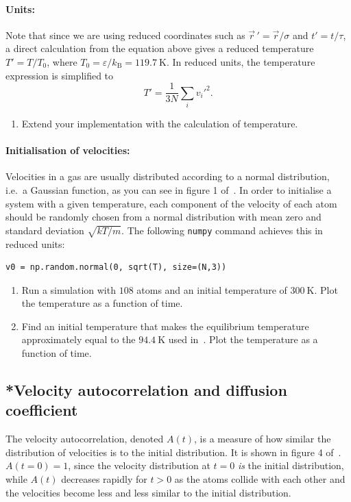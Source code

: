 \documentclass[11pt,british,a4paper]{report}
\begin{document}
\paragraph{Units:} Note that since we are using reduced coordinates such as \(\vec{r}\,'=\vec{r}/\sigma\) and \(t'=t/\tau\), a direct calculation from the equation above gives a reduced temperature \(T'=T/T_0\), where \(T_0 = \varepsilon/k_\mathrm{B}=\SI{119.7}{\kelvin}\). In reduced units, the temperature expression is simplified to
\[
    T' = \frac{1}{3N}\sum_i v_i'^2.
\]
\begin{enumerate}[label=\roman*.]
    \item Extend your implementation with the calculation of temperature.
\end{enumerate}

\paragraph{Initialisation of velocities:} Velocities in a gas are usually distributed according to a normal distribution, i.e.~a Gaussian function, as you can see in figure 1 of~\cite{Rahman_1964}. In order to initialise a system with a given temperature, each component of the velocity of each atom should be randomly chosen from a normal distribution with mean zero and standard deviation \(\sqrt{kT/m}\). The following \texttt{numpy} command achieves this in reduced units:
\begin{lstlisting}
v0 = np.random.normal(0, sqrt(T), size=(N,3))
\end{lstlisting}

\begin{enumerate}[label=\roman*.,resume]
    \item Run a simulation with \(108\) atoms and an initial temperature of \(\SI{300}{\kelvin}\). Plot the temperature as a function of time.
    \item Find an initial temperature that makes the equilibrium temperature approximately equal to the \(\SI{94.4}{\kelvin}\) used in~\cite{Rahman_1964}. Plot the temperature as a function of time.
\end{enumerate}

\subsection{*Velocity autocorrelation and diffusion coefficient}
The velocity autocorrelation, denoted \(A(t)\), is a measure of how similar the distribution of velocities is to the initial distribution. It is shown in figure 4 of~\cite{Rahman_1964}. \(A(t=0)=1\), since the velocity distribution at \(t=0\) \emph{is} the initial distribution, while \(A(t)\) decreases rapidly for \(t>0\) as the atoms collide with each other and the velocities become less and less similar to the initial distribution.
\end{document}
